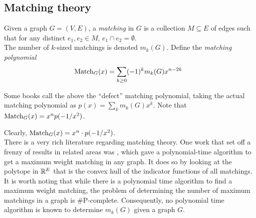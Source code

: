 

\subsection{Matching theory}

	\begin{fdef}[Matching]
		Given a graph $G = (V,E)$, a \emph{matching} in $G$ is a collection $M \subseteq E$ of edges such that for any distinct $e_1,e_2 \in M$, $e_1 \cap e_2 = \emptyset$.\\
		The number of $k$-sized matchings is denoted $m_k(G)$. Define the \emph{matching polynomial}
		\[ \operatorname{Match}_G(x) = \sum_{k \ge 0} (-1)^k m_k(G) x^{n-2k} \]
	\end{fdef}
	Some books call the above the ``defect'' matching polynomial, taking the actual matching polynomial as $p(x) = \sum_k m_k(G) x^k$. Note that $\operatorname{Match}_G(x) = x^n p(-1/x^2)$. 
	
	Clearly, $\operatorname{Match}_G(x) = x^n \cdot p(-1/x^2)$.\\

	There is a very rich literature regarding matching theory. One work that set off a frenzy of results in related areas was \cite{Edmonds1965MaximumMA}, which gave a polynomial-time algorithm to get a maximum weight matching in any graph. It does so by looking at the polytope in $\mathbb{R}^{E}$ that is the convex hull of the indicator functions of all matchings.
	It is worth noting that while there is a polynomial time algorithm to find a maximum weight matching, the problem of determining the number of maximum matchings in a graph is \textsf{\#P}-complete. Consequently, no polynomial time algorithm is known to determine $m_k(G)$ given a graph $G$.\\

